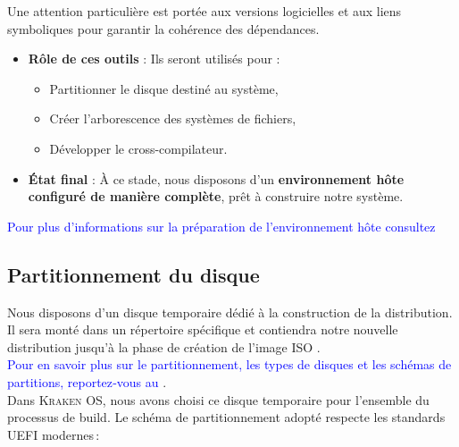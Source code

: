 Une attention particulière est portée aux versions logicielles et aux liens symboliques pour garantir la cohérence des dépendances.


\begin{itemize}  
  \item \textbf{Rôle de ces outils} :  
        Ils seront utilisés pour :  
        \begin{itemize}  
          \item Partitionner le disque destiné au système,  
          \item Créer l’arborescence des systèmes de fichiers,  
          \item Développer le cross-compilateur.  
        \end{itemize}  
  \item \textbf{État final} :  
        À ce stade, nous disposons d’un \textbf{environnement hôte configuré de manière complète}, prêt à construire notre système.  
\end{itemize}  
\textcolor{blue}{Pour plus d’informations sur  la préparation de l’environnement hôte  consultez} \cite{lfs_book} 
 \subsection{Partitionnement du disque}
\label{sssec:partitionnement}

Nous disposons d’un disque temporaire dédié à la construction de la distribution. Il sera monté dans un répertoire spécifique et contiendra notre nouvelle distribution jusqu’à la phase de création de l’image ISO .\\
\textcolor{blue}{Pour en savoir plus sur le partitionnement, les types de disques et les schémas de partitions, reportez‑vous au \cite{archlinux_partition}}.\\



Dans \textsc{Kraken OS}, nous avons choisi ce disque temporaire pour l’ensemble du processus de build. Le schéma de partitionnement adopté respecte les standards UEFI modernes :

